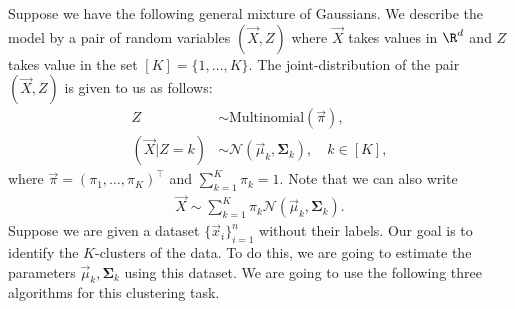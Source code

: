 \documentclass[preview]{standalone}
\begin{document}

Suppose we have the following general mixture of Gaussians.
We describe the model by a pair of random variables $(\vec{X}, Z)$
where $\vec{X}$ takes values in $\R^d$ and $Z$ takes value in the set
$[K]=\{1, \ldots, K\}$.
The joint-distribution of the pair $(\vec{X}, Z)$ is given to us as follows:
\begin{align*}
  Z &\sim \text{Multinomial}(\vec{\pi}),\\
  (\vec{X} \vert Z = k) &\sim \mathcal{N}(\vec{\mu}_k, {\bm \Sigma}_k), \quad k \in [K],
\end{align*}
where $\vec{\pi} = (\pi_1, \ldots, \pi_K)^\top$ and $\sum_{k=1}^K \pi_k = 1$.
Note that we can also write
\begin{align*}
	\vec{X} \sim \sum_{k=1}^K \pi_k \mathcal{N}(\vec{\mu}_k, {\bm \Sigma}_k).
\end{align*}
Suppose we are given a dataset $\{\vec{x}_i\}_{i=1}^n$ without their labels.
Our goal is to identify the $K$-clusters of the data. To do this, we are going to estimate the
parameters $\vec{\mu}_k, {\bm \Sigma}_k$ using this dataset.
We are going to use the following three algorithms for this clustering task.
\end{document}
